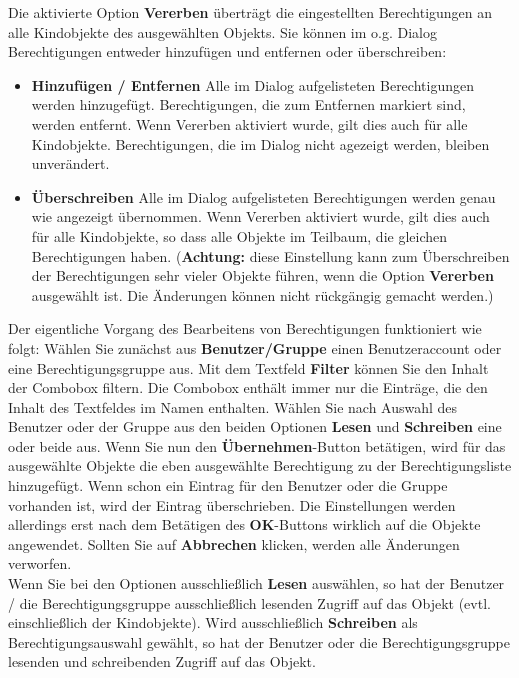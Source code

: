 \documentclass[a4paper,10pt]{book}
\begin{document}
\newline
Die aktivierte Option \textbf{Vererben} überträgt die eingestellten Berechtigungen an alle Kindobjekte des ausgewählten Objekts.
Sie können im o.g. Dialog Berechtigungen entweder hinzufügen und entfernen oder überschreiben:
\begin{itemize}
 \item \textbf{Hinzufügen / Entfernen}
    \subitem Alle im Dialog aufgelisteten Berechtigungen werden hinzugefügt. Berechtigungen, die zum Entfernen markiert sind, werden entfernt. Wenn Vererben aktiviert wurde, gilt dies auch für alle Kindobjekte. Berechtigungen, die im Dialog nicht agezeigt werden, bleiben unverändert.
 \item \textbf{Überschreiben}
    \subitem Alle im Dialog aufgelisteten Berechtigungen werden genau wie angezeigt übernommen.  Wenn Vererben aktiviert wurde, gilt dies auch für alle Kindobjekte, so dass alle Objekte im Teilbaum, die gleichen Berechtigungen haben. (\textbf{Achtung:} diese Einstellung kann zum Überschreiben der Berechtigungen sehr vieler Objekte führen, wenn die Option \textbf{Vererben} ausgewählt ist. Die Änderungen können nicht rückgängig gemacht werden.)
\end{itemize}
Der eigentliche Vorgang des Bearbeitens von Berechtigungen funktioniert wie folgt: Wählen Sie zunächst aus \textbf{Benutzer/Gruppe} einen
Benutzeraccount oder eine Berechtigungsgruppe aus. Mit dem Textfeld \textbf{Filter} können Sie den Inhalt der Combobox filtern. Die Combobox enthält immer nur die Einträge, die den Inhalt des Textfeldes im Namen enthalten. Wählen Sie nach Auswahl des Benutzer oder der Gruppe aus den beiden Optionen \textbf{Lesen} und \textbf{Schreiben} eine oder beide aus. Wenn Sie nun den \textbf{Übernehmen}-Button betätigen, wird für das ausgewählte Objekte die eben ausgewählte Berechtigung
zu der Berechtigungsliste hinzugefügt. Wenn schon ein Eintrag für den Benutzer oder die Gruppe vorhanden ist, wird der Eintrag überschrieben. Die Einstellungen werden allerdings erst nach dem Betätigen des \textbf{OK}-Buttons wirklich auf die Objekte
angewendet. Sollten Sie auf \textbf{Abbrechen} klicken, werden alle Änderungen verworfen.
\newline\\
Wenn Sie bei den Optionen ausschließlich \textbf{Lesen} auswählen, so hat der Benutzer / die Berechtigungsgruppe ausschließlich lesenden Zugriff auf das Objekt (evtl. einschließlich der Kindobjekte). Wird ausschließlich \textbf{Schreiben} als Berechtigungsauswahl gewählt, so hat der Benutzer oder die Berechtigungsgruppe lesenden und schreibenden Zugriff auf das Objekt.
\end{document}
